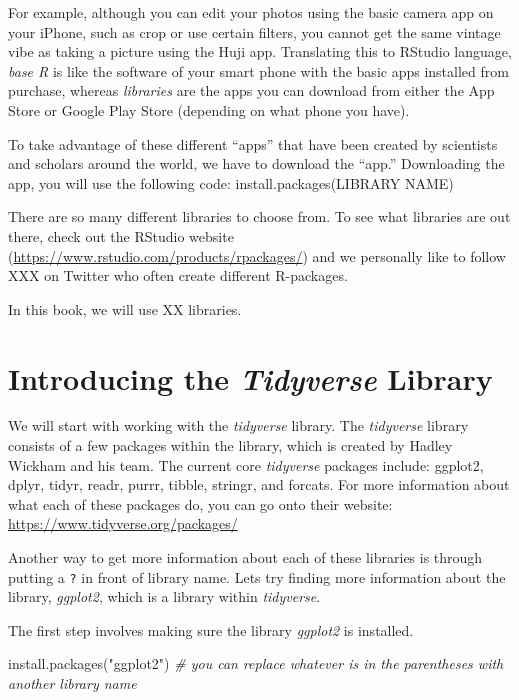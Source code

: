 \documentclass[
]{book}
\newenvironment{Shaded}{\begin{snugshade}}{\end{snugshade}}
\newcommand{\CommentTok}[1]{\textcolor[rgb]{0.56,0.35,0.01}{\textit{#1}}}
\newcommand{\FunctionTok}[1]{\textcolor[rgb]{0.00,0.00,0.00}{#1}}
\newcommand{\NormalTok}[1]{#1}
\newcommand{\StringTok}[1]{\textcolor[rgb]{0.31,0.60,0.02}{#1}}
\begin{document}
For example, although you can edit your photos using the basic camera app on your iPhone, such as crop or use certain filters, you cannot get the same vintage vibe as taking a picture using the Huji app. Translating this to RStudio language, \emph{base R} is like the software of your smart phone with the basic apps installed from purchase, whereas \emph{libraries} are the apps you can download from either the App Store or Google Play Store (depending on what phone you have).

To take advantage of these different ``apps'' that have been created by scientists and scholars around the world, we have to download the ``app.'' Downloading the app, you will use the following code:
install.packages(LIBRARY NAME)

There are so many different libraries to choose from. To see what libraries are out there, check out the RStudio website (\url{https://www.rstudio.com/products/rpackages/}) and we personally like to follow XXX on Twitter who often create different R-packages.

In this book, we will use XX libraries.

\hypertarget{introducing-the-tidyverse-library}{%
\section{\texorpdfstring{Introducing the \emph{Tidyverse} Library}{Introducing the Tidyverse Library}}\label{introducing-the-tidyverse-library}}

We will start with working with the \emph{tidyverse} library. The \emph{tidyverse} library consists of a few packages within the library, which is created by Hadley Wickham and his team. The current core \emph{tidyverse} packages include: ggplot2, dplyr, tidyr, readr, purrr, tibble, stringr, and forcats. For more information about what each of these packages do, you can go onto their website: \url{https://www.tidyverse.org/packages/}

Another way to get more information about each of these libraries is through putting a \texttt{?} in front of library name. Lets try finding more information about the library, \emph{ggplot2}, which is a library within \emph{tidyverse}.

The first step involves making sure the library \emph{ggplot2} is installed.

\begin{Shaded}
\begin{Highlighting}[]
\FunctionTok{install.packages}\NormalTok{(}\StringTok{"ggplot2"}\NormalTok{) }\CommentTok{\# you can replace whatever is in the parentheses with another library name }
\end{Highlighting}
\end{Shaded}
\end{document}
